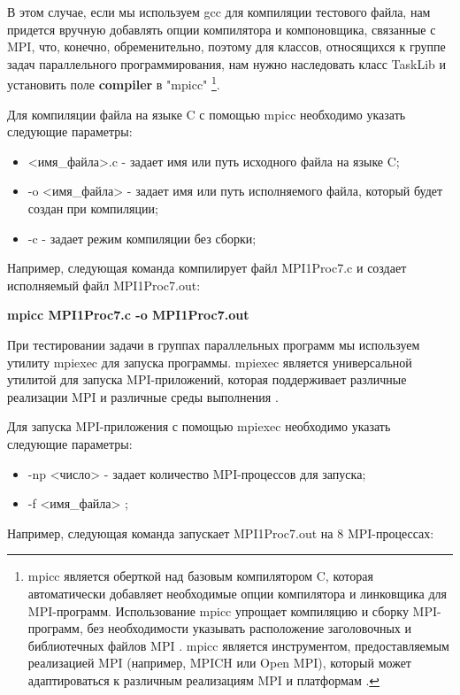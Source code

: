 В этом случае, если мы используем gcc для компиляции тестового файла, нам придется 
вручную добавлять опции компилятора и компоновщика, связанные с MPI, что, конечно, 
обременительно, поэтому для классов, относящихся к группе задач параллельного 
программирования, нам нужно наследовать класс TaskLib и установить поле \textbf{compiler} в "mpicc"
\footnote{mpicc является оберткой над базовым компилятором C, которая автоматически 
добавляет необходимые опции компилятора и линковщика для MPI-программ. Использование
 mpicc упрощает компиляцию и сборку MPI-программ, без необходимости указывать 
 расположение заголовочных и библиотечных файлов MPI \cite{ref7} \cite{ref8}. 
 mpicc является инструментом, предоставляемым реализацией MPI (например, 
 MPICH или Open MPI), который может адаптироваться к различным реализациям 
 MPI и платформам \cite{ref9} \cite{ref10}.}.

 Для компиляции файла на языке C с помощью mpicc необходимо указать следующие параметры:

\begin{itemize}
	\item <имя\_файла>.c - задает имя или путь исходного файла на языке C;
	\item -o <имя\_файла> - задает имя или путь исполняемого файла, который будет создан при компиляции;
	\item -c - задает режим компиляции без сборки;
\end{itemize}

 
 Например, следующая команда компилирует файл MPI1Proc7.c и создает исполняемый файл MPI1Proc7.out:
 
 \centerline{\textbf{mpicc MPI1Proc7.c -o MPI1Proc7.out}}

При тестировании задачи в группах параллельных программ мы используем утилиту mpiexec 
для запуска программы. mpiexec является универсальной утилитой для запуска 
MPI-приложений, которая поддерживает различные реализации MPI и различные среды выполнения \cite{ref6}.

Для запуска MPI-приложения с помощью mpiexec необходимо указать следующие параметры:

\begin{itemize}
	\item -np <число> - задает количество MPI-процессов для запуска;
	\item -f <имя\_файла> ;
\end{itemize}

Например, следующая команда запускает MPI1Proc7.out на 8 MPI-процессах:

